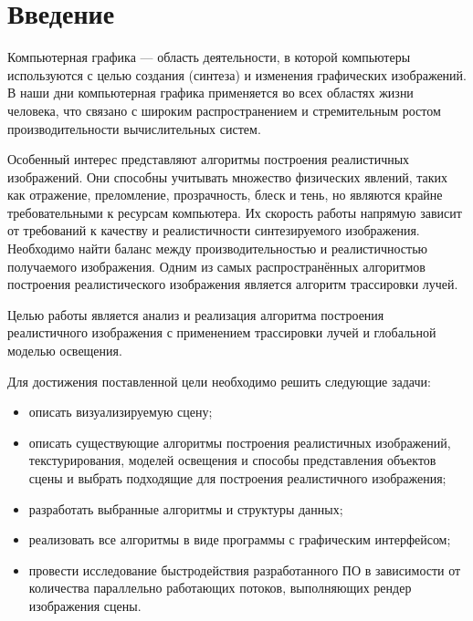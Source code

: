 \chapter*{Введение}

Компьютерная графика — область деятельности, в которой компьютеры используются с целью создания (синтеза) и изменения графических изображений. В наши дни компьютерная графика применяется во всех областях жизни человека, что связано с широким распространением и  стремительным ростом производительности вычислительных систем. 

Особенный интерес представляют алгоритмы построения реалистичных изображений. Они способны учитывать множество физических явлений, таких как отражение, преломление, прозрачность, блеск и тень, но являются крайне требовательными к ресурсам компьютера. Их скорость работы напрямую зависит от требований к качеству и реалистичности синтезируемого изображения. Необходимо найти баланс между производительностью и реалистичностью получаемого изображения. Одним из самых распространённых алгоритмов построения реалистического изображения является алгоритм трассировки лучей.

Целью работы является анализ и реализация алгоритма построения реалистичного изображения с применением трассировки лучей и глобальной моделью освещения.

Для достижения поставленной цели необходимо решить следующие задачи:
\begin{itemize}[label=---]
	\item описать визуализируемую сцену;
	\item описать существующие алгоритмы построения реалистичных изображений, текстурирования, моделей освещения и способы представления объектов сцены и выбрать подходящие для построения реалистичного изображения;
	\item разработать выбранные алгоритмы и структуры данных;
	\item реализовать все алгоритмы в виде программы с графическим интерфейсом;
	\item провести исследование быстродействия разработанного ПО в зависимости от количества параллельно работающих потоков, выполняющих рендер изображения сцены.
\end{itemize}